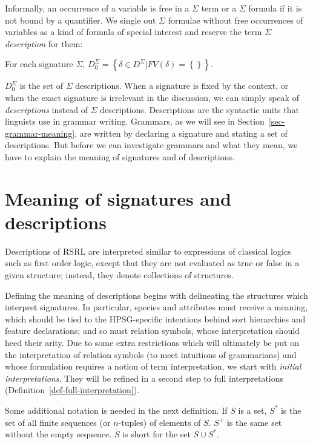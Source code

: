 \documentclass[output=paper
                ,modfonts
                ,nonflat
	        ,collection
	        ,collectionchapter
	        ,collectiontoclongg
 	        ,biblatex
                ,babelshorthands
                ,newtxmath
                ,draftmode
                ,colorlinks, citecolor=brown
]{./langsci/langscibook}
\begin{document}
{Informally, an occurrence of a variable is free in a $\Sigma$ term or a
$\Sigma$ formula if it is not bound by a quantifier. We single out
$\Sigma$ formulae without free occurrences of variables as a kind of formula
of special interest and reserve the term $\Sigma$ \emph{description} for them:

\begin{mydef}
  For each signature $\Sigma$,
  $D_0^{\Sigma}=\left\{\delta\in D^{\Sigma} | FV(\delta)=\left\{\right\}\right\}$.
\end{mydef}

$D_0^{\Sigma}$ is the set of $\Sigma$ descriptions.
When a signature is fixed by the context, or when the exact signature is
irrelevant in the discussion, we can simply speak of \emph{descriptions}
instead of $\Sigma$ descriptions. Descriptions are the syntactic units
that linguists use in grammar writing. Grammars, as we will see in
Section~\ref{sec-grammar-meaning}, are written by declaring a signature
and stating a set of descriptions. But before we can investigate grammars and
what they mean, we
have to explain the meaning of signatures and of descriptions.


  
\section{Meaning of signatures and descriptions}
\label{sec-meaning}

Descriptions of RSRL are interpreted similar to expressions of
classical logics such as first order logic, except that they are not
evaluated as true or false in a given structure; instead, they denote
collections of structures.

Defining the meaning of descriptions begins with delineating the
structures which interpret signatures. In particular, species and
attributes must receive a meaning, which should be tied to the
HPSG-specific intentions behind sort hierarchies and feature
declarations; and so must relation symbols, whose interpretation
should heed their arity. Due to some extra restrictions which will
ultimately be put on the interpretation of relation symbols (to meet
intuitions of grammarians) and whose
formulation requires a notion of term interpretation, we start with
\emph{initial interpretations}. They will be refined in a second
step to full interpretations (Definition~\ref{def-full-interpretation}).

Some additional notation is needed in the next definition. If $S$ is a
set, $S^{*}$ is the set of all finite sequences (or $n$-tuples) of elements
of $S$. $S^{+}$ is the same set without the empty sequence. $\overline{S}$
is short for the set $S\cup S^{*}$.

}
\end{document}
